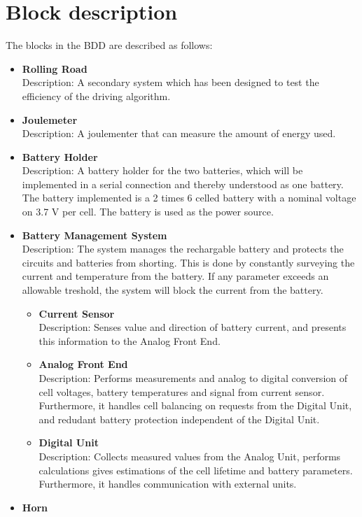 \section{Block description}
The blocks in the BDD are described as follows:
\begin{itemize}
	\item \textbf{Rolling Road}\\
	Description: A secondary system which has been designed to test the efficiency of the driving algorithm.
	\item \textbf{Joulemeter}\\
	Description: A joulementer that can measure the amount of energy used.
	\item \textbf{Battery Holder}\\
	Description: A battery holder for the two batteries, which will be implemented in a serial connection and thereby understood as one battery. The battery implemented is a 2 times 6 celled battery with a nominal voltage on 3.7 V per cell. The battery is used as the power source.
	\item \textbf{Battery Management System}\\
	Description: The system manages the rechargable battery and protects the circuits and batteries from shorting. This is done by constantly surveying the current and temperature from the battery. If any parameter exceeds an allowable treshold, the system will block the current from the battery.
	\begin{itemize}
		\item \textbf{Current Sensor}\\
		Description: Senses value and direction of battery current, and presents this information to the Analog Front End.
		\item \textbf{Analog Front End}\\
		Description: Performs measurements and analog to digital conversion of cell voltages, battery temperatures and signal from current sensor. Furthermore, it handles cell balancing on requests from the Digital Unit, and redudant battery protection independent of the Digital Unit.
		\item \textbf{Digital Unit}\\
		Description: Collects measured values from the Analog Unit, performs calculations gives estimations of the cell lifetime and battery parameters. Furthermore, it handles communication with external units.
	\end{itemize}
	\item \textbf{Horn}\\

\end{itemize}
